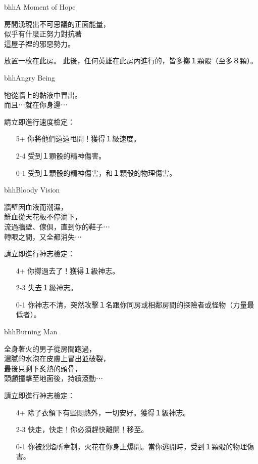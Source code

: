 %
\begin{EventCard}{bhh}{A Moment of Hope}
  \begin{CardStory}
    房間湧現出不可思議的正面能量，\\
    似乎有什麼正努力對抗著\\
    這屋子裡的邪惡勢力。
  \end{CardStory}
  放置一枚在此房。\smallbreak
  此後，任何英雄在此房內進行的，皆多擲１顆骰（至多８顆）。\smallbreak
\end{EventCard}%
\linebreak[0]%
\begin{EventCard}{bhh}{Angry Being}
  \begin{CardStory}
    牠從牆上的黏液中冒出。\\
    而且⋯就在你身邊⋯
  \end{CardStory}
  請立即進行速度檢定：
  \begin{itemize}
    \item[5+] 你將他們遠遠甩開！獲得１級速度。
    \item[2-4] 受到１顆骰的精神傷害。
    \item[0-1] 受到１顆骰的精神傷害，和１顆骰的物理傷害。
  \end{itemize}
\end{EventCard}%
\linebreak[0]%
\begin{EventCard}{bhh}{Bloody Vision}
  \begin{CardStory}
    牆壁因血液而潮濕，\\
    鮮血從天花板不停滴下，\\
    流過牆壁、傢俱，直到你的鞋子⋯\\
    轉眼之間，又全都消失⋯
  \end{CardStory}
  請立即進行神志檢定：
  \begin{itemize}
    \item[4+] 你撐過去了！獲得１級神志。
    \item[2-3] 失去１級神志。
    \item[0-1] 你神志不清，突然攻擊１名跟你同房或相鄰房間的探險者或怪物（力量最低者）。
  \end{itemize}
\end{EventCard}%
\linebreak[0]%
\begin{EventCard}{bhh}{Burning Man}
  \begin{CardStory}
    全身著火的男子從房間跑過，\\
    濃膩的水泡在皮膚上冒出並破裂，\\
    最後只剩下炙熱的頭骨，\\
    頭顱撞擊至地面後，持續滾動⋯
  \end{CardStory}
  請立即進行神志檢定：
  \begin{itemize}
    \item[4+] 除了衣領下有些悶熱外，一切安好。獲得１級神志。
    \item[2-3] 快走，快走！你必須趕快離開！移至。
    \item[0-1] 你被烈焰所牽制，火花在你身上爆開。當你逃開時，受到１顆骰的物理傷害。
  \end{itemize}
\end{EventCard}%

